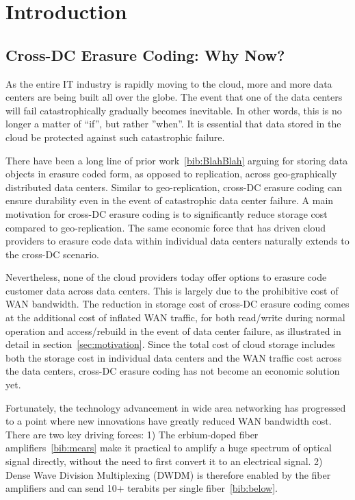 \section{Introduction}

\subsection{Cross-DC Erasure Coding: Why Now?}

As the entire IT industry is rapidly moving to the cloud, more and more data centers are being built all over the globe. The event that one of the data centers will fail catastrophically gradually becomes inevitable. In other words, this is no longer a matter of ``if'', but rather ''when''. It is essential that data stored in the cloud be protected against such catastrophic failure.

There have been a long line of prior work~\ref{bib:BlahBlah} arguing for storing data objects in erasure coded form, as opposed to replication, across geo-graphically distributed data centers. Similar to geo-replication, cross-DC erasure coding can ensure durability even in the event of catastrophic data center failure. A main motivation for cross-DC erasure coding is to significantly reduce storage cost compared to geo-replication. The same economic force that has driven cloud providers to erasure code data within individual data centers naturally extends to the cross-DC scenario.

Nevertheless, none of the cloud providers today offer options to erasure code customer data across data centers. This is largely due to the prohibitive cost of WAN bandwidth. The reduction in storage cost of cross-DC erasure coding comes at the additional cost of inflated WAN traffic, for both read/write during normal operation and access/rebuild in the event of data center failure, as illustrated in detail in section~\ref{sec:motivation}.
Since the total cost of cloud storage includes both the storage cost in individual data centers and the WAN traffic cost across the data centers, cross-DC erasure coding has not become an economic solution yet.

Fortunately, the technology advancement in wide area networking has progressed to a point where new innovations have greatly reduced WAN bandwidth cost. There are two key driving forces: 1) The erbium-doped fiber amplifiers~\ref{bib:mears} make it practical to amplify a huge spectrum of optical signal directly, without the need to first convert it to an electrical signal. 2) Dense Wave Division Multiplexing (DWDM) is therefore enabled by the fiber amplifiers and can send 10+ terabits per single fiber~\ref{bib:below}.

